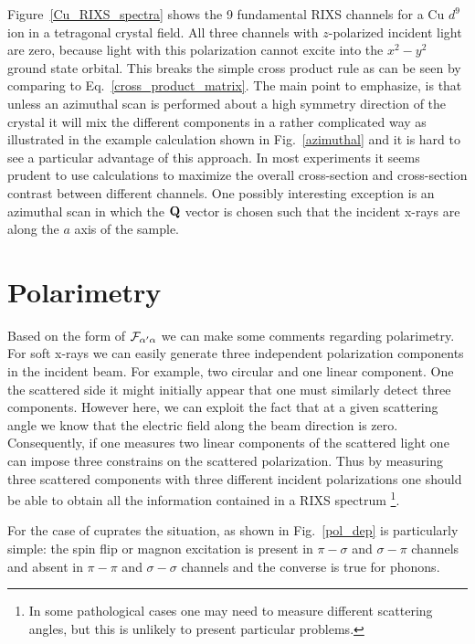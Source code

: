 \documentclass[aps,onecolumn, notitlepage, longbibliography]{revtex4-1}
\begin{document}
Figure~\ref{Cu_RIXS_spectra} shows the 9 fundamental RIXS channels for a Cu $d^9$ ion in a tetragonal crystal field. All three channels with $z$-polarized incident light are zero, because light with this polarization cannot excite into the $x^2-y^2$ ground state orbital. This breaks the simple cross product rule as can be seen by comparing to Eq.~\ref{cross_product_matrix}. The main point to emphasize, is that unless an azimuthal scan is performed about a high symmetry direction of the crystal it will mix the different components in a rather complicated way as illustrated in the example calculation shown in Fig.~\ref{azimuthal} and it is hard to see a particular advantage of this approach. In most experiments it seems prudent to use calculations to maximize the overall cross-section and cross-section contrast between different channels. One possibly interesting exception is an azimuthal scan in which the ${\bf Q}$ vector is chosen such that the incident x-rays are along the $a$ axis of the sample. 

\section{Polarimetry}
Based on the form of ${\cal F}_{\alpha^\prime\alpha}$ we can make some comments regarding polarimetry. For soft x-rays we can easily generate three independent polarization components in the incident beam. For example, two circular and one linear component. One the scattered side it might initially appear that one must similarly detect three components. However here, we can exploit the fact that at a given scattering angle we know that the electric field along the beam direction is zero. Consequently, if one measures two linear components of the scattered light one can impose three constrains on the scattered polarization. Thus by measuring three scattered components with three different incident polarizations one should be able to obtain all the information contained in a RIXS spectrum \footnote{In some pathological cases one may need to measure different scattering angles, but this is unlikely to present particular problems.}. 

For the case of cuprates the situation, as shown in Fig.~\ref{pol_dep} is particularly simple: the spin flip or magnon excitation is present in $\pi-\sigma$ and $\sigma-\pi$ channels and absent in $\pi-\pi$ and $\sigma-\sigma$ channels and the converse is true for phonons. 

\end{document}
